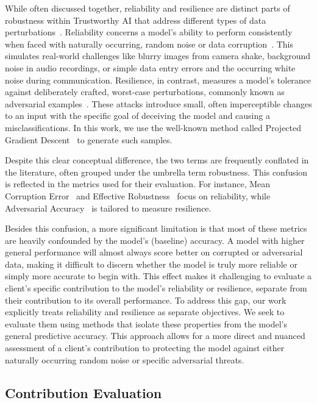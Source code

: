 \documentclass{uai2026}
\begin{document}
While often discussed together, reliability and resilience are distinct parts of robustness within Trustworthy AI that address different types of data perturbations~\cite{fawzi2016robustness}. Reliability concerns a model's ability to perform consistently when faced with naturally occurring, random noise or data corruption~\cite{shannon1948}. This simulates real-world challenges like blurry images from camera shake, background noise in audio recordings, or simple data entry errors and the occurring white noise during communication. Resilience, in contrast, measures a model's tolerance against deliberately crafted, worst-case perturbations, commonly known as adversarial examples~\cite{goodfellow2014explaining}. These attacks introduce small, often imperceptible changes to an input with the specific goal of deceiving the model and causing a misclassifications. In this work, we use the well-known method called Projected Gradient Descent~\cite{madry2017towards} to generate such samples.

Despite this clear conceptual difference, the two terms are frequently conflated in the literature, often grouped under the umbrella term robustness. This confusion is reflected in the metrics used for their evaluation. For instance, Mean Corruption Error~\cite{mCE} and Effective Robustness~\cite{effectiverelative} focus on reliability, while Adversarial Accuracy~\cite{23metric} is tailored to measure resilience.

Besides this confusion, a more significant limitation is that most of these metrics are heavily confounded by the model's (baseline) accuracy. A model with higher general performance will almost always score better on corrupted or adversarial data, making it difficult to discern whether the model is truly more reliable or simply more accurate to begin with. This effect makes it challenging to evaluate a client's specific contribution to the model's reliability or resilience, separate from their contribution to its overall performance. To address this gap, our work explicitly treats reliability and resilience as separate objectives. We seek to evaluate them using methods that isolate these properties from the model's general predictive accuracy. This approach allows for a more direct and nuanced assessment of a client's contribution to protecting the model against either naturally occurring random noise or specific adversarial threats.

\subsection{Contribution Evaluation}
\end{document}

